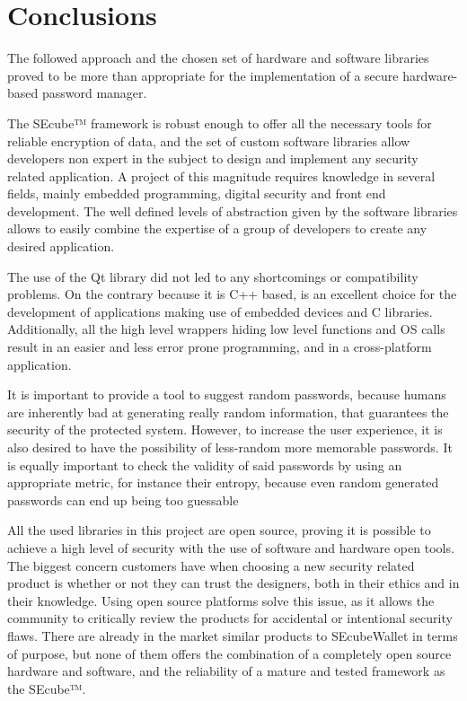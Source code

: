 \chapter{Conclusions} \label{chap:con}

The followed approach and the chosen set of hardware and software libraries proved to be more than appropriate for the implementation of a secure hardware-based password manager.

\vspace{7pt}

The SEcube™ framework is robust enough to offer all the necessary tools for reliable encryption of data, and the set of custom software libraries allow developers non expert in the subject to design and implement any security related application. A project of this magnitude requires knowledge in several fields, mainly embedded programming, digital security and front end development. The well defined levels of abstraction given by the software libraries allows to easily combine the expertise of a group of developers to create any desired application.

\vspace{7pt}

The use of the Qt library did not led to any shortcomings or compatibility problems. On the contrary because it is C++ based, is an excellent choice for the development of applications making use of embedded devices and C libraries. Additionally, all the high level wrappers hiding low level functions and OS calls result in an easier and less error prone programming, and in a cross-platform application.

\vspace{7pt}

It is important to provide a tool to suggest random passwords, because humans are inherently bad at generating really random information, that guarantees the security of the protected system. However, to increase the user experience, it is also desired to have the possibility of less-random more memorable passwords. It is equally important to check the validity of said passwords by using an appropriate metric, for instance their entropy, because even random generated passwords can end up being too guessable

\vspace{7pt}

All the used libraries in this project are open source, proving it is possible to achieve a high level of security with the use of software and hardware open tools. The biggest concern customers have when choosing a new security related product is whether or not they can trust the designers, both in their ethics and in their knowledge. Using open source platforms solve this issue, as it allows the community to critically review the products for accidental or intentional security flaws. There are already in the market similar products to SEcubeWallet in terms of purpose, but none of them offers the combination of a completely open source hardware and software, and the reliability of a mature and tested framework as the SEcube™.

